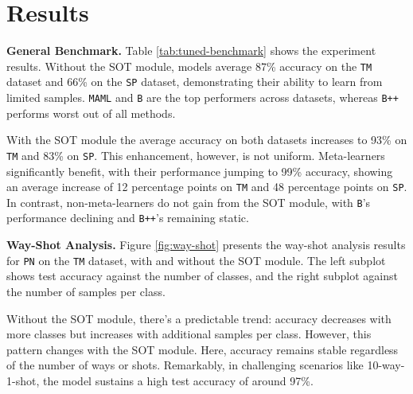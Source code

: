\section{Results}


\textbf{General Benchmark.} Table \ref{tab:tuned-benchmark} shows the experiment results. Without the SOT module, models average 87\% accuracy on the \texttt{TM} dataset and 66\% on the \texttt{SP} dataset, demonstrating their ability to learn from limited samples. \texttt{MAML} and \texttt{B} are the top performers across datasets, whereas \texttt{B++} performs worst out of all methods.

With the SOT module the average accuracy on both datasets increases to 93\% on \texttt{TM} and 83\% on \texttt{SP}. This enhancement, however, is not uniform. Meta-learners significantly benefit, with their performance jumping to 99\% accuracy, showing an average increase of 12 percentage points on \texttt{TM} and 48 percentage points on \texttt{SP}. In contrast, non-meta-learners do not gain from the SOT module, with \texttt{B}'s performance declining and \texttt{B++}'s remaining static.





\textbf{Way-Shot Analysis.} Figure \ref{fig:way-shot} presents the way-shot analysis results for \texttt{PN} on the \texttt{TM} dataset, with and without the SOT module. The left subplot shows test accuracy against the number of classes, and the right subplot against the number of samples per class.

Without the SOT module, there's a predictable trend: accuracy decreases with more classes but increases with additional samples per class. However, this pattern changes with the SOT module. Here, accuracy remains stable regardless of the number of ways or shots. Remarkably, in challenging scenarios like 10-way-1-shot, the model sustains a high test accuracy of around 97\%.


